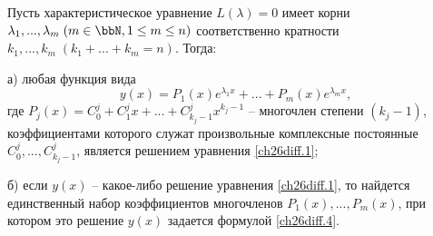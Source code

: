 \begin{thm} \label{ch26thm1}
Пусть характеристическое уравнение $L(\lambda)=0$ имеет корни $\lambda_1,...,\lambda_m\;(m\in \bbN, 1\leq m\leq n)$ соответственно кратности $k_1,...,k_m\;(k_1+...+k_m=n).$ Тогда:

а) любая функция вида
\begin{equation} \label{ch26diff.4}
y(x)=P_1(x)e^{\lambda_1x}+...+P_m(x)e^{{\lambda_m}x},
\end{equation}
где $P_j(x)=C_0^j+C_1^jx+...+C_{k_j-1}^jx^{k_j-1}$ -- многочлен степени $(k_j-1)$, коэффициентами которого служат произвольные комплексные постоянные  $C_0^j,...,C_{k_j-1}^j$, является решением уравнения \eqref{ch26diff.1};

б) если $y(x)$ -- какое-либо решение уравнения \eqref{ch26diff.1}, то найдется единственный набор коэффициентов многочленов $P_1(x),...,P_m(x)$, при котором это решение $y(x)$ задается формулой \eqref{ch26diff.4}.
\end{thm}

